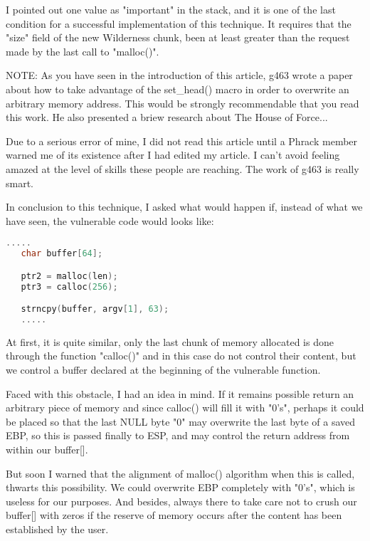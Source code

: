 \documentclass[12pt]{article}
\begin{document}
I pointed out one value as "important" in the stack, and it is one of
the last condition for a successful implementation of this technique.
It requires that the "size" field of the new Wilderness chunk, been at
least greater than the request made by the last call to "malloc()".
\newline


NOTE: As you have seen in the introduction of this article, g463 wrote a
      paper about how to take advantage of the set\_head() macro in order
      to overwrite an arbitrary memory address. This would be strongly
      recommendable that you read this work. He also presented a briew
      research about The House of Force...
\newline


      Due to a serious error of mine, I did not read this article until
      a Phrack member warned me of its existence after I had edited my
      article. I can't avoid feeling amazed at the level of skills these
      people are reaching. The work of g463 is really smart.
\newline


In conclusion to this technique, I asked what would happen if, instead of
what we have seen, the vulnerable code would looks like:
\begin{lstlisting}[language=C]
   .....
   char buffer[64];

   ptr2 = malloc(len);
   ptr3 = calloc(256);

   strncpy(buffer, argv[1], 63);
   .....
\end{lstlisting}

At first, it is quite similar, only the last chunk of memory allocated is
done through the function "calloc()" and in this case do not control their
content, but we control a buffer declared at the beginning of the
vulnerable function.
\newline


Faced with this obstacle, I had an idea in mind. If it remains possible
return an arbitrary piece of memory and since calloc() will fill it with
"0's", perhaps it could be placed so that the last NULL byte "0" may
overwrite the last byte of a saved EBP, so this is passed finally to ESP,
and may control the return address from within our buffer[].
\newline


But soon I warned that the alignment of malloc() algorithm when this is
called, thwarts this possibility. We could overwrite EBP completely with
"0's", which is useless for our purposes. And besides, always there to
take care not to crush our buffer[] with zeros if the reserve of memory
occurs after the content has been established by the user.
\newline
\end{document}
